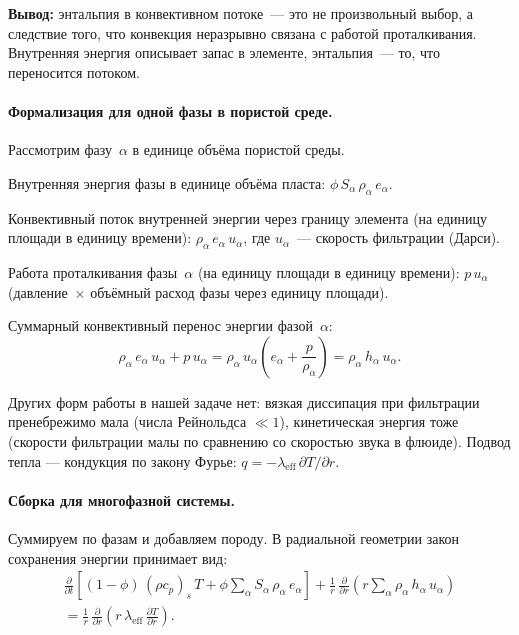 \documentclass[12pt,a4paper]{article}
\begin{document}
\textbf{Вывод:} энтальпия в конвективном потоке~--- это не произвольный
выбор, а следствие того, что конвекция неразрывно связана с работой
проталкивания. Внутренняя энергия описывает запас в элементе, энтальпия~---
то, что переносится потоком.

\paragraph{Формализация для одной фазы в пористой среде.}
Рассмотрим фазу~$\alpha$ в единице объёма пористой среды.

Внутренняя энергия фазы в единице объёма пласта:
$\phi\,S_\alpha\,\rho_\alpha\,e_\alpha$.

Конвективный поток внутренней энергии через границу элемента
(на единицу площади в единицу времени): $\rho_\alpha\,e_\alpha\,u_\alpha$,
где $u_\alpha$~--- скорость фильтрации (Дарси).

Работа проталкивания фазы~$\alpha$ (на единицу площади в единицу
времени): $p\,u_\alpha$ (давление~$\times$ объёмный расход фазы через
единицу площади).

Суммарный конвективный перенос энергии фазой~$\alpha$:
\begin{equation}\label{eq:conv_flux_alpha}
  \rho_\alpha\,e_\alpha\,u_\alpha + p\,u_\alpha
  = \rho_\alpha\,u_\alpha\!\left(e_\alpha + \frac{p}{\rho_\alpha}\right)
  = \rho_\alpha\,h_\alpha\,u_\alpha.
\end{equation}

Других форм работы в нашей задаче нет: вязкая диссипация при фильтрации
пренебрежимо мала (числа Рейнольдса $\ll 1$), кинетическая энергия
тоже (скорости фильтрации малы по сравнению со скоростью звука в
флюиде). Подвод тепла --- кондукция по закону Фурье:
$q = -\lambda_{\mathrm{eff}}\,\partial T/\partial r$.

\paragraph{Сборка для многофазной системы.}
Суммируем по фазам и добавляем породу. В радиальной геометрии
закон сохранения энергии принимает вид:
\begin{multline}\label{eq:energy_derivation}
  \frac{\partial}{\partial t}\!\left[
    (1-\phi)\,(\rho c_p)_s\,T
    + \phi\sum_\alpha S_\alpha\,\rho_\alpha\,e_\alpha
  \right]
  + \frac{1}{r}\,\frac{\partial}{\partial r}\!\left(
    r\sum_\alpha \rho_\alpha\,h_\alpha\,u_\alpha
  \right) \\
  = \frac{1}{r}\,\frac{\partial}{\partial r}\!\left(
      r\,\lambda_{\mathrm{eff}}\,\frac{\partial T}{\partial r}
    \right).
\end{multline}
\end{document}
